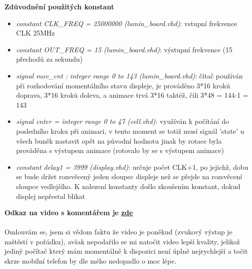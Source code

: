 \documentclass[a4paper, 11pt]{article}
\begin{document}

	\hspace*{4.5cm}\textbf{\Large \centering Zdůvodnění použitých konstant} \\		
	\begin{itemize}
		\item \emph{constant CLK\_FREQ = 25000000 (lumin\_board.vhd)}: vstupní frekvence CLK 25MHz
		\item \emph{constant OUT\_FREQ = 15 (lumin\_board.vhd)}: výstupní frekvence (15 přechodů za sekundu)
		\item \emph{signal mov\_cnt : integer range 0 to 143 (lumin\_board.vhd)}: čítač používán při rozhodování momentálního stavu displeje, je prováděno 3*16 kroků doprava, 3*16 kroků doleva, a animace trvá 3*16  taktéž, čili 3*48 = 144-1 = 143
		\item \emph{signal cnter = integer range 0 to 47 (cell.vhd)}: využíván k počítání do posledního kroku při animaci, v tento moment se totiž musí signál 'state' u všech buněk nastavit opět na původní hodnotu jinak by rotace byla prováděna s výstupem animace (rotovalo by se s výstupem animace)
		\item \emph{constant delay1 = 3999 (display.vhd)}: určuje počet CLK+1, po jejichž, dobu se bude držet rozsvěcený jeden sloupec displeje než se přejde na rozsvěcení sloupce vedlejšího. K nalezení konstanty došlo zkoušením konstant, dokud displej nepřestal blikat
	\end{itemize}


	\hspace*{4cm}\textbf{\Large \centering Odkaz na video s komentářem je \href{https://drive.google.com/file/d/150QRpHBC9p5e2X4qCt9Scvb0kyMNy3he/view?usp=sharing}{zde}} \\ \\
	\noindent Omlouvám se, jsem si vědom faktu že video je poněkud  (zvukový výstup je naštěstí v pořádku), avšak nepodařilo se mi natočit video lepší kvality, jelikož jediný počítač který mám momentálně k dispozici není úplně nejrychlejší a točit skrze mobilní telefon by dle mého nedopadlo o moc lépe.


	

	\newpage
\end{document}
